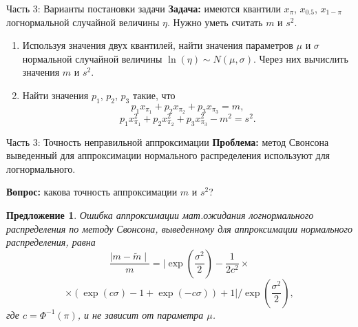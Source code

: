 \documentclass[ucs, notheorems, handout]{beamer}
\newtheorem{proposition2}[theorem]{Предложение}
\begin{document}
	\begin{frame}{Часть 3: Варианты постановки задачи}
		\textbf{Задача:} имеются квантили $x_{\pi}$, $x_{0.5}$, $x_{1-\pi}$ логнормальной случайной величины $\eta$. Нужно уметь считать $m$ и $s^{2}$.
		
		\begin{enumerate}
			\item Используя значения двух квантилей, найти значения параметров $\mu$ и $\sigma$ нормальной случайной величины $\ln(\eta)\sim N(\mu, \sigma)$. Через них вычислить значения $m$ и $s^{2}$.
			\item Найти значения $p_{1}$, $p_{2}$, $p_{3}$ такие, что 
			\begin{equation*}
				p_{1}x_{\pi_{1}} + p_{2}x_{\pi_{2}} + p_{3}x_{\pi_{3}} = m, \label{2}
			\end{equation*}
			\begin{equation*}
				p_{1} x_{\pi_{1}}^{2} + p_{2} x_{\pi_{2}}^{2} + p_{3} x_{\pi_{3}}^{2} - m^{2} = s^{2}.
			\end{equation*}
			
		\end{enumerate}
		
	\end{frame}
	
	\begin{frame}{Часть 3: Точность неправильной аппроксимации}
		\textbf{Проблема:} метод Свонсона выведенный для аппроксимации нормального распределения используют для логнормального.
		
		\textbf{Вопрос:} какова точность аппроксимации $m$ и $s^{2}$?
		
		\begin{proposition2}\label{pr5}
			Ошибка аппроксимации мат.ожидания логнормального распределения по методу Свонсона, выведенному для аппроксимации нормального распределения, равна
			\[\dfrac{\mid m - \widetilde{m} \mid}{m} = \biggl| \exp\left( \dfrac{\sigma^{2}}{2}\right)  - \dfrac{1}{2 c^{2}}\times\]\[\times(\exp(c\sigma)-1 +\exp(-c\sigma)) + 1 \biggr|/\exp\left(\dfrac{\sigma^{2}}{2}\right),\]
			где $c = \Phi^{-1}(\pi)$, и не зависит от параметра $\mu$.
		\end{proposition2}
		
	\end{frame}
	
\end{document}
